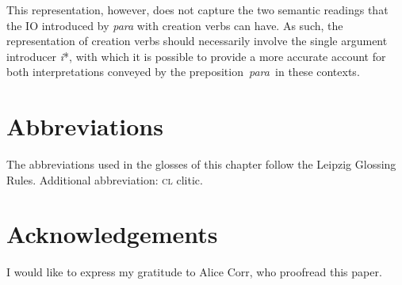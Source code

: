 \documentclass[output=paper,colorlinks,citecolor=brown,modfonts,nonflat]{langsci/langscibook}
\begin{document}
This representation, however, does not capture the two semantic readings that the IO introduced by \textit{para} with creation verbs can have. As such, the representation of creation verbs should necessarily involve the single argument introducer \textit{i}*, with which it is possible to provide a more accurate account for both interpretations conveyed by the preposition~\textit{para~}in these contexts.


\section*{Abbreviations}
The abbreviations used in the glosses of this chapter follow the Leipzig Glossing Rules. Additional abbreviation: \textsc{cl} clitic.

\section*{Acknowledgements}
I would like to express my gratitude to Alice Corr, who proofread this paper.

\sloppy\printbibliography[heading=subbibliography,notkeyword=this]
\end{document}
